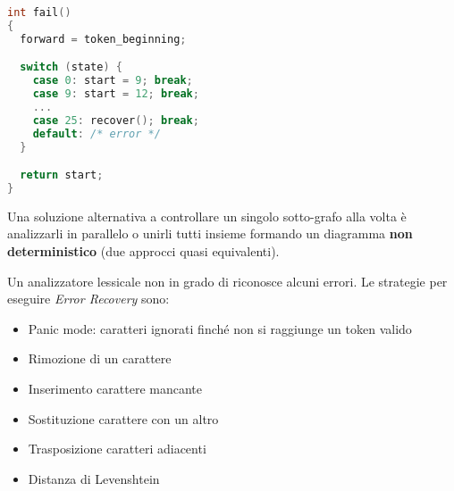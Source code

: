 \begin{lstlisting}[caption=Codice funzione \textit{fail}, language=C]
int fail()
{
  forward = token_beginning;

  switch (state) {
    case 0: start = 9; break;
    case 9: start = 12; break;
    ...
    case 25: recover(); break;
    default: /* error */
  }

  return start;
}
\end{lstlisting}

Una soluzione alternativa a controllare un singolo sotto-grafo alla volta è
analizzarli in parallelo o unirli tutti insieme formando un diagramma
\textbf{non deterministico} (due approcci quasi equivalenti).

Un analizzatore lessicale non in grado di riconosce alcuni errori. Le strategie
per eseguire \textit{Error Recovery} sono:
\begin{itemize}
\item Panic mode: caratteri ignorati finché non si raggiunge un token valido
\item Rimozione di un carattere
\item Inserimento carattere mancante
\item Sostituzione carattere con un altro
\item Trasposizione caratteri adiacenti
\item Distanza di Levenshtein
\end{itemize}
